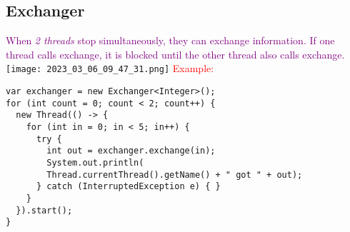 \documentclass[main.tex,fontsize=8pt,paper=a4,paper=portrait,DIV=calc,]{scrartcl}
\begin{document}
\subsection{Exchanger}
\textcolor{purple}{When \emph{2 threads} stop simultaneously, they can exchange information. If one thread calls exchange, it is blocked until the other thread also calls exchange.}\newline
\texttt{[image: 2023\_03\_06\_09\_47\_31.png]}\newline
\textcolor{red}{Example:}
\begin{lstlisting}
var exchanger = new Exchanger<Integer>();
for (int count = 0; count < 2; count++) {
  new Thread(() -> {
    for (int in = 0; in < 5; in++) {
      try {
        int out = exchanger.exchange(in);
        System.out.println(
        Thread.currentThread().getName() + " got " + out);
      } catch (InterruptedException e) { }
    }
  }).start();
}
\end{lstlisting}
\end{document}
